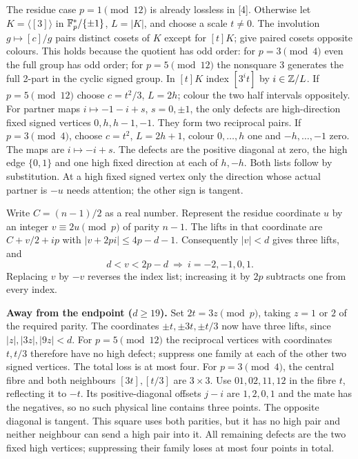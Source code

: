 \documentclass[10pt]{article}
\begin{document}
The residue case $p=1\pmod{12}$ is already lossless in [4]. Otherwise let $K=\langle[3]\rangle$ in $\mathbb F_p^*/\{\pm1\}$, $L=|K|$, and choose a scale $t\ne0$. The involution $g\mapsto[c]/g$ pairs distinct cosets of $K$ except for $[t]K$; give paired cosets opposite colours. This holds because the quotient has odd order: for $p=3\pmod4$ even the full group has odd order; for $p=5\pmod{12}$ the nonsquare 3 generates the full 2-part in the cyclic signed group. In $[t]K$ index $[3^it]$ by $i\in\mathbb Z/L$. If $p=5\pmod{12}$ choose $c=t^2/3$, $L=2h$; colour the two half intervals oppositely. For partner maps $i\mapsto-1-i+s$, $s=0,\pm1$, the only defects are high-direction fixed signed vertices $0,h,h-1,-1$. They form two reciprocal pairs. If $p=3\pmod4$, choose $c=t^2$, $L=2h+1$, colour $0,\ldots,h$ one and $-h,\ldots,-1$ zero. The maps are $i\mapsto-i+s$. The defects are the positive diagonal at zero, the high edge $\{0,1\}$ and one high fixed direction at each of $h,-h$. Both lists follow by substitution. At a high fixed signed vertex only the direction whose actual partner is $-u$ needs attention; the other sign is tangent.

\newpage{}
Write $C=(n-1)/2$ as a real number. Represent the residue coordinate $u$ by an integer $v\equiv2u\pmod p$ of parity $n-1$. The lifts in that coordinate are $C+v/2+i p$ with $|v+2pi|\le4p-d-1$. Consequently $|v|<d$ gives three lifts, and
\[
 d<v<2p-d\ \Longrightarrow\ i=-2,-1,0,1.\tag{1}
\]
Replacing $v$ by $-v$ reverses the index list; increasing it by $2p$ subtracts one from every index.

\textbf{Away from the endpoint ($d\ge19$).} Set $2t=3z\pmod p$, taking $z=1$ or $2$ of the required parity. The coordinates $\pm t,\pm3t,\pm t/3$ now have three lifts, since $|z|,|3z|,|9z|<d$. For $p=5\pmod{12}$ the reciprocal vertices with coordinates $t,t/3$ therefore have no high defect; suppress one family at each of the other two signed vertices. The total loss is at most four. For $p=3\pmod4$, the central fibre and both neighbours $[3t],[t/3]$ are $3\times3$. Use $01,02,11,12$ in the fibre $t$, reflecting it to $-t$. Its positive-diagonal offsets $j-i$ are $1,2,0,1$ and the mate has the negatives, so no such physical line contains three points. The opposite diagonal is tangent. This square uses both parities, but it has no high pair and neither neighbour can send a high pair into it. All remaining defects are the two fixed high vertices; suppressing their family loses at most four points in total.
\end{document}

